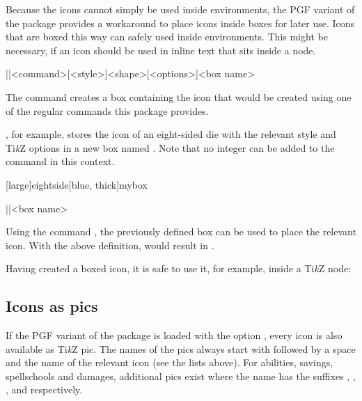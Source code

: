 \documentclass[a4paper]{article}
\begin{document}
Because the icons cannot simply be used inside  environments, the PGF variant of the package provides a workaround to place icons inside boxes for later use. Icons that are boxed this way can safely used inside  environments. This might be necessary, if an icon should be used in inline text that sits inside a node.

\begin{macrodef}|\provideprotectedrpgicon|{<command>}[<style>]{<shape>}[<options>]{<box name>}\end{macrodef}
The command \macro{\provideprotectedrpgicon} creates a box containing the icon that would be created using one of the regular commands this package provides.

, for example, stores the icon of an eight-sided die with the relevant style and Ti\emph{k}Z options in a new box named . Note that no integer can be added to the  command in this context.

[large]{eightside}[blue, thick]{mybox}

\begin{macrodef}|\useprotectedrpgicon|{<box name>}\end{macrodef}
Using the command \macro{\useprotectedrpgicon}, the previously defined box can be used to place the relevant icon. With the above definition,  would result in .

Having created a boxed icon, it is safe to use it, for example, inside a Ti\emph{k}Z node:

\begin{codeexample}
\end{codeexample}

\subsection{Icons as pics}\label{sec:pics}

If the PGF variant of the package is loaded with the option , every icon is also available as Ti\emph{k}Z pic. The names of the pics always start with  followed by a space and the name of the relevant icon (see the lists above). For abilities, savings, spellschools and damages, additional pics exist where the name has the suffixes , , , and  respectively.
\end{document}
